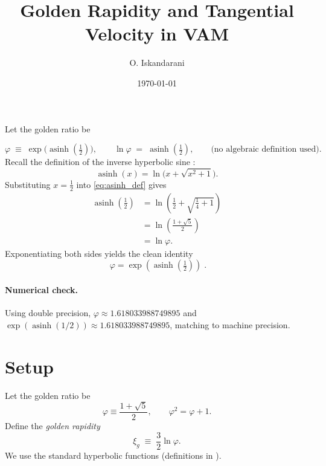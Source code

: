 \documentclass[11pt]{article}
\title{Golden Rapidity and Tangential Velocity in VAM}
\author{O. Iskandarani}
\date{\today}
\newcommand{\xig}{\operatorname{asinh}\!\left(\tfrac{1}{2}\right)} %
\begin{document}
\maketitle

Let the golden ratio be

\begin{equation}
    \varphi \;\equiv\; \exp\!\big(\xig\big), \qquad
    \ln\varphi \;=\; \xig, \qquad
    \text{(no algebraic definition used)}.
\end{equation}
Recall the definition of the inverse hyperbolic sine \cite{NISTDLMF}:
\begin{equation}
    \operatorname{asinh}(x) = \ln\!\Big(x + \sqrt{x^2 + 1}\Big).
    \label{eq:asinh_def}
\end{equation}
Substituting $x=\tfrac{1}{2}$ into \eqref{eq:asinh_def} gives
\begin{align}
    \operatorname{asinh}\!\left(\tfrac{1}{2}\right)
    &= \ln\!\left(\tfrac{1}{2} + \sqrt{\tfrac{1}{4} + 1}\right) \\
    &= \ln\!\left(\tfrac{1 + \sqrt{5}}{2}\right) \\
    &= \ln \varphi.
\end{align}
Exponentiating both sides yields the clean identity
\begin{equation}
    \boxed{\;\varphi = \exp\!\left(\operatorname{asinh}\!\left(\tfrac{1}{2}\right)\right)\; }.
\end{equation}

\paragraph{Numerical check.}
Using double precision,
\(
\varphi \approx 1.618033988749895
\)
and
\(
\exp(\operatorname{asinh}(1/2)) \approx 1.618033988749895
\),
matching to machine precision.


\section*{Setup}
Let the golden ratio be
\begin{equation}
  \varphi \equiv \frac{1+\sqrt{5}}{2}, \qquad \varphi^2=\varphi+1.
\end{equation}
Define the \emph{golden rapidity}
\begin{equation}
  \xi_g \;\equiv\; \frac{3}{2}\ln\varphi.
\end{equation}
We use the standard hyperbolic functions (definitions in \cite{NISTDLMF}).
\end{document}
